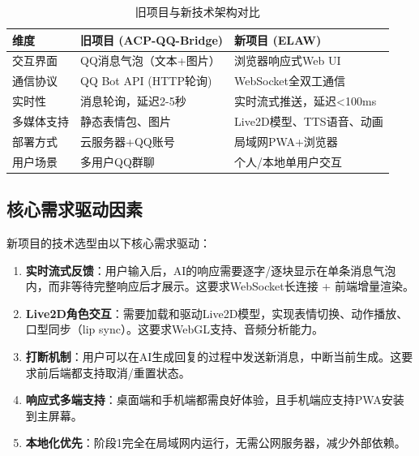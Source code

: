 \documentclass[fontset=mac,a4paper,11pt]{ctexart}
\begin{document}
\begin{table}[H]
\centering
\caption{旧项目与新技术架构对比}
\label{tab:arch-evolution}
\begin{tabular}{L{3.5cm}L{5cm}L{5cm}}
\toprule
\textbf{维度} & \textbf{旧项目 (ACP-QQ-Bridge)} & \textbf{新项目 (ELAW)} \\
\midrule
{}
交互界面 & QQ消息气泡（文本+图片） & 浏览器响应式Web UI \\
通信协议 & QQ Bot API (HTTP轮询) & WebSocket全双工通信 \\
实时性 & 消息轮询，延迟2-5秒 & 实时流式推送，延迟<100ms \\
多媒体支持 & 静态表情包、图片 & Live2D模型、TTS语音、动画 \\
部署方式 & 云服务器+QQ账号 & 局域网PWA+浏览器 \\
用户场景 & 多用户QQ群聊 & 个人/本地单用户交互 \\
\bottomrule
\end{tabular}
\end{table}

\subsection{核心需求驱动因素}

新项目的技术选型由以下核心需求驱动：

\begin{enumerate}[leftmargin=2em]
\item \textbf{实时流式反馈}：用户输入后，AI的响应需要逐字/逐块显示在单条消息气泡内，而非等待完整响应后才展示。这要求WebSocket长连接 + 前端增量渲染。

\item \textbf{Live2D角色交互}：需要加载和驱动Live2D模型，实现表情切换、动作播放、口型同步（lip sync）。这要求WebGL支持、音频分析能力。

\item \textbf{打断机制}：用户可以在AI生成回复的过程中发送新消息，中断当前生成。这要求前后端都支持取消/重置状态。

\item \textbf{响应式多端支持}：桌面端和手机端都需良好体验，且手机端应支持PWA安装到主屏幕。

\item \textbf{本地化优先}：阶段1完全在局域网内运行，无需公网服务器，减少外部依赖。
\end{enumerate}

\end{document}
